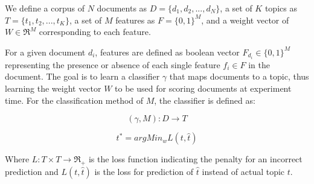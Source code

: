 

We define a corpus of $N$ documents as $D = \{{d_{1}}, {d_{2}}, ..., {d_{N}} \}$, a set of $K$ topics as $T = \{{t_{1}}, {t_{2}}, ..., {t_{K}} \}$, a set of $M$ features as $F = \{0,1\}^{M}$, and a weight vector of $W \in \Re^{M}$ corresponding to each feature. 

For a given document ${d_{i}}$, features are defined as boolean vector ${F_{d_{i}}} \in \{0,1\}^{M}$ representing the presence or absence of each single feature ${f_{i}} \in F$ in the document. The goal is to learn a classifier $\gamma$ that maps documents to a topic, thus learning the weight vector $W$ to be used for scoring documents at experiment time. For the classification method of $M$, the classifier is defined as:

\begin{equation}
(\gamma, M) : D \to T 
\end{equation}

\begin{equation}
t^{*} = argMin_{w} L(t,\hat{t})
\end{equation}

Where ${L : T \times T \to \Re_{+} }$ is the loss function indicating the penalty for an incorrect prediction and ${L(t,\hat{t})}$ is the loss for prediction of ${\hat{t}}$ instead of actual topic $t$.
%
%

